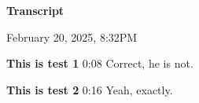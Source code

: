 \documentclass[11pt,a4paper]{article}
\begin{document}
\textbf{Transcript}

February 20, 2025, 8:32PM

\begin{figure}[h]
\end{figure}

\begin{figure}[h]
\end{figure}

\textbf{This is test 1} 0:08
Correct, he is not.

\begin{figure}[h]
\end{figure}

\textbf{This is test 2} 0:16
Yeah, exactly.
\end{document}
